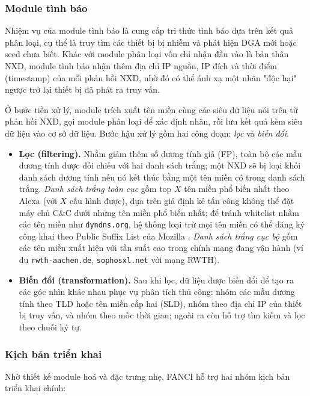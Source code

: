 \subsubsection{Module tình báo}

Nhiệm vụ của module tình báo là cung cấp tri thức tình báo dựa trên kết quả phân loại, cụ thể là truy tìm các thiết bị bị nhiễm và phát hiện DGA mới hoặc seed chưa biết. Khác với module phân loại vốn chỉ nhận đầu vào là bản thân NXD, module tình báo nhận thêm địa chỉ IP nguồn, IP đích và thời điểm (timestamp) của mỗi phản hồi NXD, nhờ đó có thể ánh xạ một nhãn "độc hại" ngược trở lại thiết bị đã phát ra truy vấn.

Ở bước tiền xử lý, module trích xuất tên miền cùng các siêu dữ liệu nói trên từ phản hồi NXD, gọi module phân loại để xác định nhãn, rồi lưu kết quả kèm siêu dữ liệu vào cơ sở dữ liệu. Bước hậu xử lý gồm hai công đoạn: \textit{lọc} và \textit{biến đổi}.

\begin{itemize}
  \item \textbf{Lọc (filtering).} Nhằm giảm thêm số dương tính giả (FP), toàn bộ các mẫu dương tính được đối chiếu với hai danh sách trắng; một NXD sẽ bị loại khỏi danh sách dương tính nếu nó kết thúc bằng một tên miền có trong danh sách trắng. \textit{Danh sách trắng toàn cục} gồm top $X$ tên miền phổ biến nhất theo Alexa (với $X$ cấu hình được), dựa trên giả định kẻ tấn công không thể đặt máy chủ C\&C dưới những tên miền phổ biến nhất; để tránh whitelist nhầm các tên miền như \texttt{dyndns.org}, hệ thống loại trừ mọi tên miền có thể đăng ký công khai theo Public Suffix List của Mozilla \cite{publicsuffix}. \textit{Danh sách trắng cục bộ} gồm các tên miền xuất hiện với tần suất cao trong chính mạng đang vận hành (ví dụ \texttt{rwth-aachen.de}, \texttt{sophosxl.net} với mạng RWTH).
  \item \textbf{Biến đổi (transformation).} Sau khi lọc, dữ liệu được biến đổi để tạo ra các góc nhìn khác nhau phục vụ phân tích thủ công: nhóm các mẫu dương tính theo TLD hoặc tên miền cấp hai (SLD), nhóm theo địa chỉ IP của thiết bị truy vấn, và nhóm theo mốc thời gian; ngoài ra còn hỗ trợ tìm kiếm và lọc theo chuỗi ký tự.
\end{itemize}

\subsubsection{Kịch bản triển khai}

Nhờ thiết kế module hoá và đặc trưng nhẹ, FANCI hỗ trợ hai nhóm kịch bản triển khai chính:

